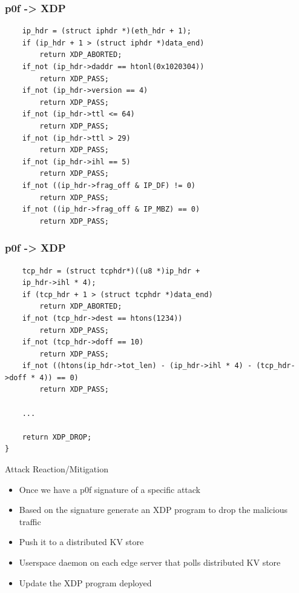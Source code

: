 \documentclass{beamer}
\begin{document}
\begin{frame}[fragile]
\frametitle{p0f -> XDP}
\begin{verbatim}
    ip_hdr = (struct iphdr *)(eth_hdr + 1);
    if (ip_hdr + 1 > (struct iphdr *)data_end)
        return XDP_ABORTED;
    if_not (ip_hdr->daddr == htonl(0x1020304))
        return XDP_PASS;
    if_not (ip_hdr->version == 4)
        return XDP_PASS;
    if_not (ip_hdr->ttl <= 64)
        return XDP_PASS;
    if_not (ip_hdr->ttl > 29)
        return XDP_PASS;
    if_not (ip_hdr->ihl == 5)
        return XDP_PASS;
    if_not ((ip_hdr->frag_off & IP_DF) != 0)
        return XDP_PASS;
    if_not ((ip_hdr->frag_off & IP_MBZ) == 0)
        return XDP_PASS;
\end{verbatim}
\end{frame}

\begin{frame}[fragile]
  \frametitle{p0f -> XDP}
  \begin{verbatim}
    tcp_hdr = (struct tcphdr*)((u8 *)ip_hdr +
    ip_hdr->ihl * 4);
    if (tcp_hdr + 1 > (struct tcphdr *)data_end)
        return XDP_ABORTED;
    if_not (tcp_hdr->dest == htons(1234))
        return XDP_PASS;
    if_not (tcp_hdr->doff == 10)
        return XDP_PASS;
    if_not ((htons(ip_hdr->tot_len) - (ip_hdr->ihl * 4) - (tcp_hdr->doff * 4)) == 0)
        return XDP_PASS;

    ...

    return XDP_DROP;
}
  \end{verbatim}
\end{frame}

\begin{frame}{Attack Reaction/Mitigation}
  \begin{itemize}
    \item Once we have a p0f signature of a specific attack
    \item Based on the signature generate an XDP program to drop the malicious traffic
    \item Push it to a distributed KV store
    \item Userspace daemon on each edge server that polls distributed KV store
    \item Update the XDP program deployed
  \end{itemize}
\end{frame}
\end{document}
